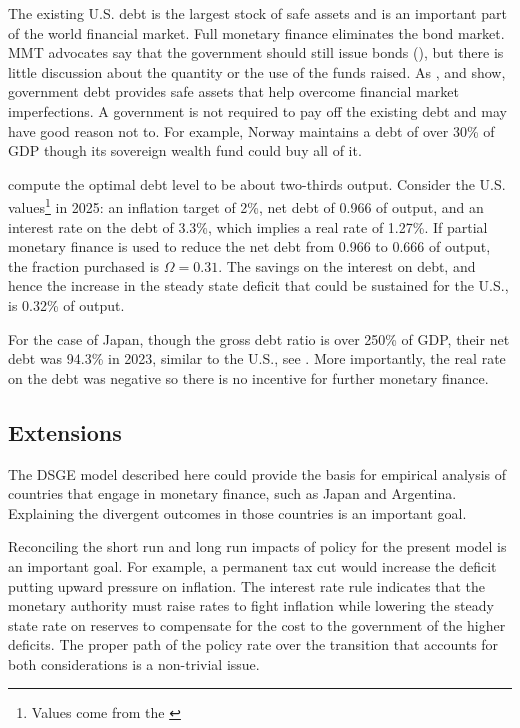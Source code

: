 \documentclass[]{article}
\begin{document}
The existing U.S. debt is the largest stock of safe assets and is an important part of the world financial market. Full monetary finance eliminates the bond market. MMT advocates say that the government should still issue bonds (\cite{mitchell2019mmt}), but there is little discussion about the quantity or the use of the funds raised. As \textcite{Woodford90debt}, \textcite{AIYAGARI98debt} and \textcite{brunnermeier2020bubble} show, government debt provides safe assets that help overcome financial market imperfections. A government is not required to pay off the existing debt and may have good reason not to. For example, Norway maintains a debt of over 30\%  of GDP though its sovereign wealth fund could buy all of it.

\textcite{AIYAGARI98debt} compute the optimal debt level to be about two-thirds output. Consider the U.S. values\footnote{Values come from the \textcite{USTreasury2025Interest}} in 2025:  an inflation target of 2\%, net debt of 0.966 of output, and an interest rate on the debt of 3.3\%, which implies a real rate of 1.27\%. If partial monetary finance is used to reduce the net debt from 0.966 to 0.666 of output, the fraction purchased is $\Omega=0.31$. The savings on the interest on debt, and hence the increase in the steady state deficit that could be sustained for the U.S., is 0.32\% of output.

For the case of Japan, though the gross debt ratio is over 250\% of GDP, their net debt was 94.3\% in 2023, similar to the U.S., see \textcite{chien2023japan}. More importantly, the real rate on the debt was negative so there is no incentive for further monetary finance.

\subsection{Extensions}

The DSGE model described here could provide the basis for empirical analysis of countries that engage in monetary finance, such as Japan and Argentina. Explaining the divergent outcomes in those countries is an important goal.

Reconciling the short run and long run impacts of policy for the present model is an important goal. For example, a permanent tax cut would increase the deficit putting upward pressure on inflation. The interest rate rule indicates that the monetary authority must raise rates to fight inflation while lowering the steady state rate on reserves to compensate for the cost to the government of the higher deficits. The proper path of the policy rate over the transition that accounts for both considerations is a non-trivial issue.
\end{document}
